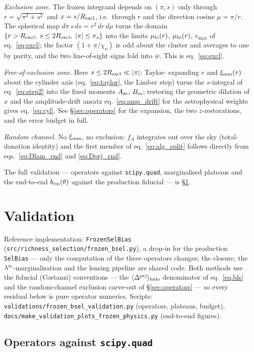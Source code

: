 \documentclass[a4paper, 11pt]{article}
\newcommand{\ltr}{\lambda^{\rm tr}}
\newcommand{\dprj}{\Delta^{\rm prj}}
\newcommand{\ximm}{\xi_{\rm mm}}
\newcommand{\Rex}{R_{\rm excl}}
\newcommand{\brm}{b_{\rm rm}}
\newcommand{\Dp}{\langle \dprj\rangle}
\newcommand{\pis}{\pi_s}
\newcommand{\rmax}{r_{\max}}
\newcommand{\mulo}{\mu_{\rm lo}}
\newcommand{\muhi}{\mu_{\rm hi}}
\newcommand{\barw}{\bar w}
\newcommand{\Ass}{A_{\rm ss}}
\newcommand{\Bss}{B_{\rm ss}}
\begin{document}
\emph{Exclusion zone.} The frozen integrand depends on $(\pi,s)$
only through $r=\sqrt{\pi^2+s^2}$ and $x=s/\Rex$, i.e.\ through
$r$ and the direction cosine $\mu=\pi/r$. The spherical map
$d\pi\,s\,ds = r^2\,dr\,d\mu$ turns the domain
$\{r>\Rex,\;s\le2\Rex,\;|\pi|\le\pis\}$ into the limits
$\mulo(r)$, $\muhi(r)$, $\rmax$ of
eq.~\eqref{eq:excl}; the factor $(1+\pi/\chi_o)$ is odd about
the cluster and averages to one by parity, and the two
line-of-sight signs fold into $\barw$. This is
eq.~\eqref{eq:excl}.

\emph{Free-of-exclusion zone.} Here $s\le2\Rex\ll|\pi|$: Taylor-
expanding $r$ and $\ximm(r)$ about the cylinder axis
(eq.~\ref{eq:taylor}, the Limber step) turns the $s$-integral of
eq.~\eqref{eq:step2} into the fixed moments $\Ass$,
$\Bss$; restoring the geometric dilation of $x$ and the
amplitude-drift ansatz eq.~\eqref{eq:amp_drift} for the
astrophysical weights gives eq.~\eqref{eq:cyl}. See
\S\ref{sec:operators} for the expansion, the two $z$-restorations,
and the error budget in full.

\emph{Random channel.} No $\ximm$, no exclusion: $f_A$
integrates out over the sky (total-donation identity) and the
first member of eq.~\eqref{eq:alg_split} follows directly from
eqs.~\eqref{eq:Dlam_rnd} and \eqref{eq:Dprj_rnd}.

The full validation --- operators against \texttt{scipy.quad},
marginalised plateaus and the end-to-end $\brm(\theta)$ against
the production fiducial --- is \S\ref{sec:validation}.

\section{Validation}
\label{sec:validation}

Reference implementation: \texttt{FrozenSelBias}
(\texttt{src/richness\_selection/frozen\_bsel.py}), a drop-in for
the production \texttt{SelBias} --- only the computation of the
three operators changes; the closure, the $\ltr$-marginalisation
and the lensing pipeline are shared code. Both methods use the
fiducial (Costanzi) conventions --- the $\Dp_{\rm halo}$
denominator of eq.~\eqref{eq:bls} and the random-channel
exclusion carve-out of \S\ref{sec:operators} --- so every
residual below is pure operator numerics. Scripts:
\texttt{validations/frozen\_bsel\_validation.py} (operators,
plateaus, budget),
\texttt{docs/make\_validation\_plots\_frozen\_physics.py}
(end-to-end figures).

\subsection{Operators against \texorpdfstring{\texttt{scipy.quad}}{scipy.quad}}
\end{document}
